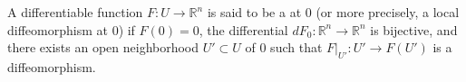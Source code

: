 A differentiable function $F: U \rightarrow \mathbb{R}^n$ is said to be a  at $0$ (or more precisely, a local diffeomorphism at $0$) if $F(0) = 0$, the differential $dF_0: \mathbb{R}^n \rightarrow \mathbb{R}^n$ is bijective, and there exists an open neighborhood $U' \subset U$ of $0$ such that $F|_{U'}: U' \rightarrow F(U')$ is a diffeomorphism.

